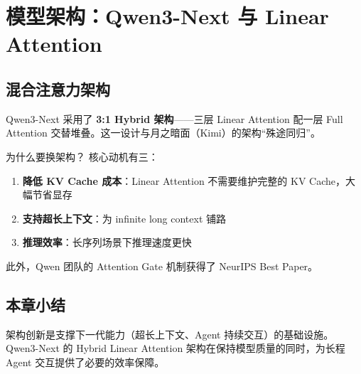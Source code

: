 \section{模型架构：Qwen3-Next 与 Linear Attention}

\subsection{混合注意力架构}

Qwen3-Next 采用了 \textbf{3:1 Hybrid 架构}——三层 Linear Attention 配一层 Full Attention 交替堆叠。这一设计与月之暗面（Kimi）的架构``殊途同归''。

\begin{importantbox}{为什么要换架构？}
核心动机有三：
\begin{enumerate}
    \item \textbf{降低 KV Cache 成本}：Linear Attention 不需要维护完整的 KV Cache，大幅节省显存
    \item \textbf{支持超长上下文}：为 infinite long context 铺路
    \item \textbf{推理效率}：长序列场景下推理速度更快
\end{enumerate}
此外，Qwen 团队的 Attention Gate 机制获得了 NeurIPS Best Paper。
\end{importantbox}

\subsection{本章小结}

架构创新是支撑下一代能力（超长上下文、Agent 持续交互）的基础设施。Qwen3-Next 的 Hybrid Linear Attention 架构在保持模型质量的同时，为长程 Agent 交互提供了必要的效率保障。

